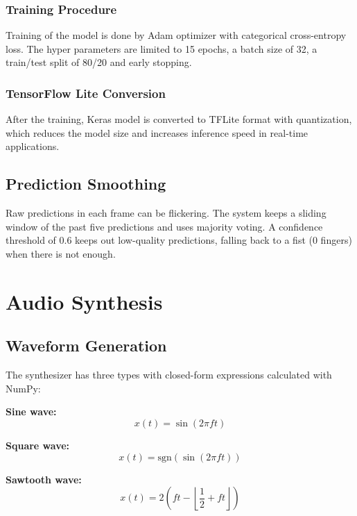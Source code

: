 \documentclass[conference]{IEEEtran}
\begin{document}
\subsubsection{Training Procedure}

Training of the model is done by Adam optimizer with categorical cross-entropy loss. The hyper parameters are limited to 15 epochs, a batch size of 32, a train/test split of 80/20 and early stopping.

\subsubsection{TensorFlow Lite Conversion}

After the training, Keras model is converted to TFLite format with quantization, which reduces the model size and increases inference speed in real-time applications.

\subsection{Prediction Smoothing}

Raw predictions in each frame can be flickering. The system keeps a sliding window of the past five predictions and uses majority voting. A confidence threshold of 0.6 keeps out low-quality predictions, falling back to a fist (0 fingers) when there is not enough.

\section{Audio Synthesis}

\subsection{Waveform Generation}

The synthesizer has three types with closed-form expressions calculated with NumPy:

\textbf{Sine wave:}
\begin{equation}
x(t) = \sin(2\pi f t)
\label{eq:sine}
\end{equation}

\textbf{Square wave:}
\begin{equation}
x(t) = \text{sgn}(\sin(2\pi f t))
\label{eq:square}
\end{equation}

\textbf{Sawtooth wave:}
\begin{equation}
x(t) = 2\left(ft - \left\lfloor \frac{1}{2} + ft \right\rfloor\right)
\label{eq:sawtooth}
\end{equation}
\end{document}
